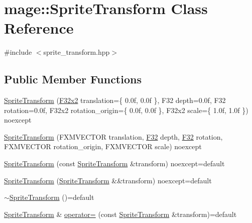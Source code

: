\hypertarget{classmage_1_1_sprite_transform}{}\section{mage\+:\+:Sprite\+Transform Class Reference}
\label{classmage_1_1_sprite_transform}


{\ttfamily \#include $<$sprite\+\_\+transform.\+hpp$>$}

\subsection*{Public Member Functions}
\begin{DoxyCompactItemize}
\item 
\mbox{\hyperlink{classmage_1_1_sprite_transform_a8d3760699d035e6315218bb6b589a2cb}{Sprite\+Transform}} (\mbox{\hyperlink{namespacemage_a9dc0d34d6ecc87e4cfa4a826102117bc}{F32x2}} translation=\{ 0.\+0f, 0.\+0f \}, F32 depth=0.\+0f, F32 rotation=0.\+0f, F32x2 rotation\+\_\+origin=\{ 0.\+0f, 0.\+0f \}, F32x2 scale=\{ 1.\+0f, 1.\+0f \}) noexcept
\item 
\mbox{\hyperlink{classmage_1_1_sprite_transform_a72e3b546e705870fb6359770468e7faa}{Sprite\+Transform}} (F\+X\+M\+V\+E\+C\+T\+OR translation, \mbox{\hyperlink{namespacemage_aa97e833b45f06d60a0a9c4fc22ae02c0}{F32}} depth, \mbox{\hyperlink{namespacemage_aa97e833b45f06d60a0a9c4fc22ae02c0}{F32}} rotation, F\+X\+M\+V\+E\+C\+T\+OR rotation\+\_\+origin, F\+X\+M\+V\+E\+C\+T\+OR scale) noexcept
\item 
\mbox{\hyperlink{classmage_1_1_sprite_transform_acbb83bc167067a81a5d0b6255e886133}{Sprite\+Transform}} (const \mbox{\hyperlink{classmage_1_1_sprite_transform}{Sprite\+Transform}} \&transform) noexcept=default
\item 
\mbox{\hyperlink{classmage_1_1_sprite_transform_a320698bf4095c5886256bd17e32a6e3f}{Sprite\+Transform}} (\mbox{\hyperlink{classmage_1_1_sprite_transform}{Sprite\+Transform}} \&\&transform) noexcept=default
\item 
\mbox{\hyperlink{classmage_1_1_sprite_transform_a14a3614023996cbb071c3de99f9528bc}{$\sim$\+Sprite\+Transform}} ()=default
\item 
\mbox{\hyperlink{classmage_1_1_sprite_transform}{Sprite\+Transform}} \& \mbox{\hyperlink{classmage_1_1_sprite_transform_af0adccff92d48e7b347e66277981ee07}{operator=}} (const \mbox{\hyperlink{classmage_1_1_sprite_transform}{Sprite\+Transform}} \&transform)=default
\item 

\end{DoxyCompactItemize}
